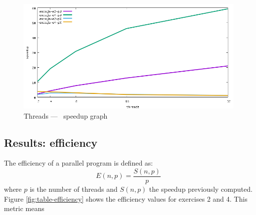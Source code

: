 \documentclass[a4paper]{article}
\begin{document}
\begin{figure}[h]
    \centering
    \includegraphics[width=\textwidth]{../img/speedup}
    \caption{Threads --- \unskip \, speedup graph}
    \label{fig:graph-speedup}
\end{figure}

\subsection{Results: efficiency}
The efficiency of a parallel program is defined as:
\begin{equation}
E(n,p)=\frac{S(n,p)}{p}
\end{equation}
where $p$ is the number of threads and $S(n,p)$ the speedup previously computed. Figure \ref{fig:table-efficiency} shows the efficiency values for exercises 2 and 4. This metric means 
\end{document}
